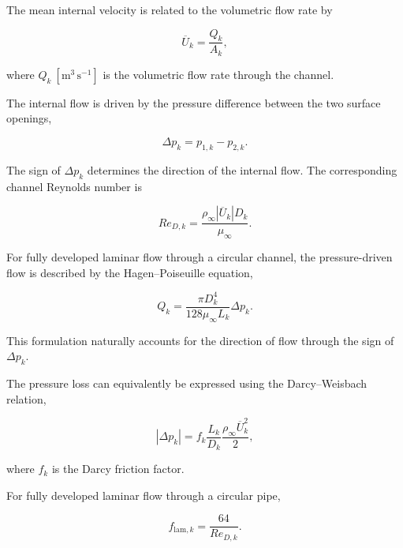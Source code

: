 \documentclass[a4paper,fleqn]{cas-dc}
\begin{document}
The mean internal velocity is related to the volumetric flow rate by

\begin{equation}
	\overline{U}_k
	=
	\frac{Q_k}{A_k},
	\label{eq:mean_channel_velocity}
\end{equation}

where $Q_k~[\mathrm{m^3\,s^{-1}}]$ is the volumetric flow rate
through the channel.

The internal flow is driven by the pressure difference between the two
surface openings,

\begin{equation}
	\Delta p_k
	=
	p_{1,k}
	-
	p_{2,k}.
	\label{eq:channel_pressure_difference}
\end{equation}

The sign of $\Delta p_k$ determines the direction of the internal
flow. The corresponding channel Reynolds number is

\begin{equation}
	Re_{D,k}
	=
	\frac{
		\rho_{\infty}
		|\overline{U}_k|
		D_k}
	{\mu_{\infty}}.
	\label{eq:internal_reynolds}
\end{equation}

For fully developed laminar flow through a circular channel, the
pressure-driven flow is described by the Hagen--Poiseuille equation,

\begin{equation}
	Q_k
	=
	\frac{
		\pi D_k^4}
	{128\mu_{\infty}L_k}
	\Delta p_k.
	\label{eq:hagen_poiseuille}
\end{equation}

This formulation naturally accounts for the direction of flow through
the sign of $\Delta p_k$.

The pressure loss can equivalently be expressed using the
Darcy--Weisbach relation,

\begin{equation}
	|\Delta p_k|
	=
	f_k
	\frac{L_k}{D_k}
	\frac{
		\rho_{\infty}
		\overline{U}_k^2}
	{2},
	\label{eq:darcy_weisbach}
\end{equation}

where $f_k$ is the Darcy friction factor.

For fully developed laminar flow through a circular pipe,

\begin{equation}
	f_{\mathrm{lam},k}
	=
	\frac{64}{Re_{D,k}}.
	\label{eq:laminar_friction_factor}
\end{equation}
\end{document}
